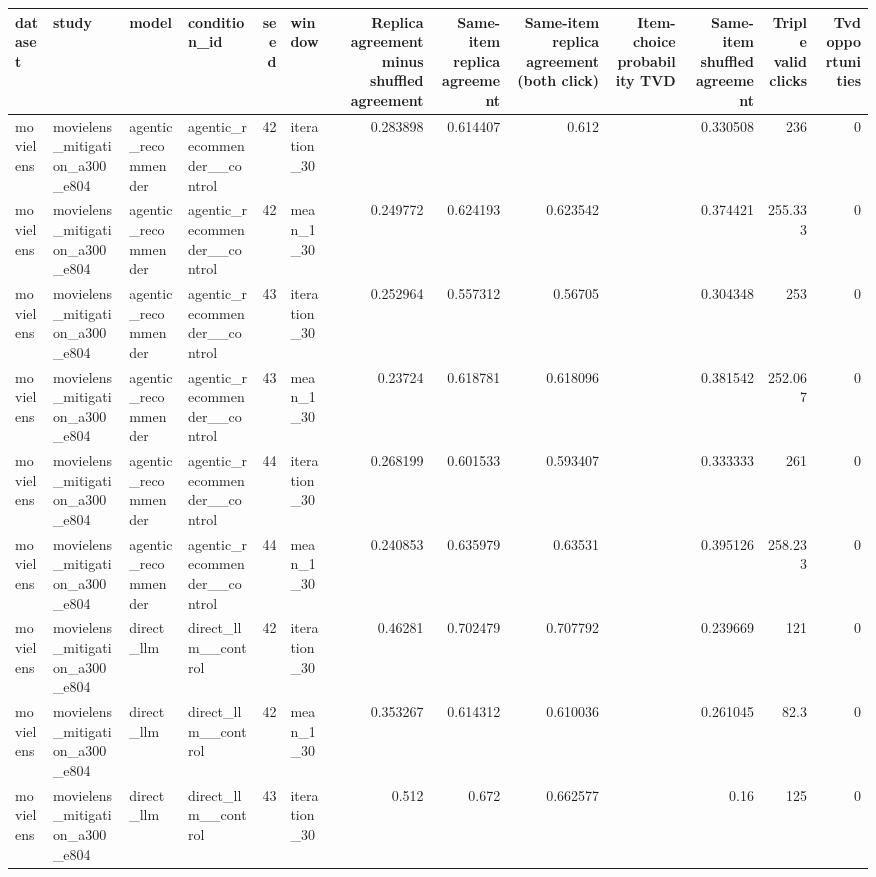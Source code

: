 \begin{table}[htbp!]
\centering
\small
\setlength{\tabcolsep}{3pt}
\renewcommand{\arraystretch}{1.1}
\begin{tabular}{llllrlrrrrrrr}
\hline
dataset & study & model & condition\_id & seed & window & Replica agreement minus shuffled agreement & Same-item replica agreement & Same-item replica agreement (both click) & Item-choice probability TVD & Same-item shuffled agreement & Triple valid clicks & Tvd opportunities \\
\hline
movielens & movielens\_mitigation\_a300\_e804 & agentic\_recommender & agentic\_recommender\_\_control & 42 & iteration\_30 & 0.283898 & 0.614407 & 0.612 & \textemdash{} & 0.330508 & 236 & 0 \\
movielens & movielens\_mitigation\_a300\_e804 & agentic\_recommender & agentic\_recommender\_\_control & 42 & mean\_1\_30 & 0.249772 & 0.624193 & 0.623542 & \textemdash{} & 0.374421 & 255.333 & 0 \\
movielens & movielens\_mitigation\_a300\_e804 & agentic\_recommender & agentic\_recommender\_\_control & 43 & iteration\_30 & 0.252964 & 0.557312 & 0.56705 & \textemdash{} & 0.304348 & 253 & 0 \\
movielens & movielens\_mitigation\_a300\_e804 & agentic\_recommender & agentic\_recommender\_\_control & 43 & mean\_1\_30 & 0.23724 & 0.618781 & 0.618096 & \textemdash{} & 0.381542 & 252.067 & 0 \\
movielens & movielens\_mitigation\_a300\_e804 & agentic\_recommender & agentic\_recommender\_\_control & 44 & iteration\_30 & 0.268199 & 0.601533 & 0.593407 & \textemdash{} & 0.333333 & 261 & 0 \\
movielens & movielens\_mitigation\_a300\_e804 & agentic\_recommender & agentic\_recommender\_\_control & 44 & mean\_1\_30 & 0.240853 & 0.635979 & 0.63531 & \textemdash{} & 0.395126 & 258.233 & 0 \\
movielens & movielens\_mitigation\_a300\_e804 & direct\_llm & direct\_llm\_\_control & 42 & iteration\_30 & 0.46281 & 0.702479 & 0.707792 & \textemdash{} & 0.239669 & 121 & 0 \\
movielens & movielens\_mitigation\_a300\_e804 & direct\_llm & direct\_llm\_\_control & 42 & mean\_1\_30 & 0.353267 & 0.614312 & 0.610036 & \textemdash{} & 0.261045 & 82.3 & 0 \\
movielens & movielens\_mitigation\_a300\_e804 & direct\_llm & direct\_llm\_\_control & 43 & iteration\_30 & 0.512 & 0.672 & 0.662577 & \textemdash{} & 0.16 & 125 & 0 \\

\end{tabular}
\end{table}
